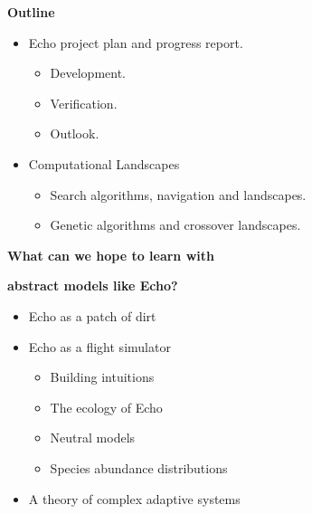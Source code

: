 %
%
\begin{slide}{}
\centerline{\bf Outline}
\begin{itemize}
\vskip 15pt
\itemsep 0pt
\parsep  0pt
\parskip 0pt
\item Echo project plan and progress report.
\begin{itemize}
\item Development.
\vskip 6pt
\item Verification.
\vskip 6pt
\item Outlook.
\end{itemize}
\vskip 6pt
\item Computational Landscapes
\begin{itemize}
\item Search algorithms, navigation and landscapes.
\vskip 6pt
\item Genetic algorithms and crossover landscapes.
\vskip 6pt
\end{itemize}
\end{itemize}
\end{slide}

%
%
\begin{slide}{}
\centerline{\bf What can we hope to learn with}
\centerline{\bf abstract models like Echo?}
\begin{itemize}
\item Echo as a patch of dirt

\item Echo as a flight simulator
\begin{itemize}
\item Building intuitions
\item The ecology of Echo
\item Neutral models
\item Species abundance distributions
\end{itemize}

\item A theory of complex adaptive systems

\end{itemize}
\end{slide}
